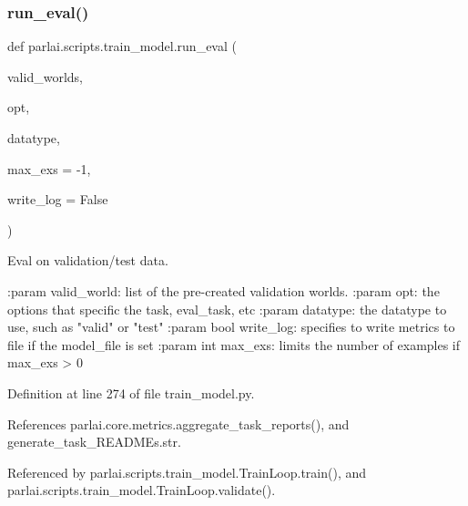 \subsubsection{\texorpdfstring{run\+\_\+eval()}{run\_eval()}}
{\footnotesize\ttfamily def parlai.\+scripts.\+train\+\_\+model.\+run\+\_\+eval (\begin{DoxyParamCaption}\item[{}]{valid\+\_\+worlds,  }\item[{}]{opt,  }\item[{}]{datatype,  }\item[{}]{max\+\_\+exs = {\ttfamily -\/1},  }\item[{}]{write\+\_\+log = {\ttfamily False} }\end{DoxyParamCaption})}

\begin{DoxyVerb}Eval on validation/test data.

:param valid_world:
    list of the pre-created validation worlds.
:param opt:
    the options that specific the task, eval_task, etc
:param datatype:
    the datatype to use, such as "valid" or "test"
:param bool write_log:
    specifies to write metrics to file if the model_file is set
:param int max_exs:
    limits the number of examples if max_exs > 0
\end{DoxyVerb}
 

Definition at line 274 of file train\+\_\+model.\+py.



References parlai.\+core.\+metrics.\+aggregate\+\_\+task\+\_\+reports(), and generate\+\_\+task\+\_\+\+R\+E\+A\+D\+M\+Es.\+str.



Referenced by parlai.\+scripts.\+train\+\_\+model.\+Train\+Loop.\+train(), and parlai.\+scripts.\+train\+\_\+model.\+Train\+Loop.\+validate().

